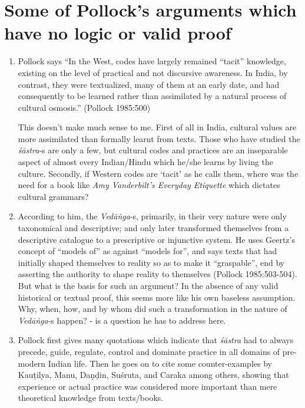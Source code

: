\section*{Some of Pollock's arguments which have no logic or valid proof}

\begin{enumerate}
\item Pollock says ``In the West, codes have largely remained ``tacit'' knowledge, existing on the level of practical and not discursive awareness. In India, by contrast, they were textualized, many of them at an early date, and had consequently to be learned rather than assimilated by a natural process of cultural osmosis.''  (Pollock 1985:500) 

This doesn't make much sense to me. First of all in India, cultural values are more assimilated than formally learnt from texts. Those who have studied the {\it śāstra}-s are only a few, but cultural codes and practices are an inseparable aspect of almost every Indian/Hindu which he/she learns by living the culture.  Secondly, if Western codes are `tacit' as he calls them, where was the need for a book like \textit{Amy Vanderbilt's Everyday Etiquette}  which dictates cultural grammars?

\item According to him, the {\it Vedāṅga}-s,  primarily, in their very nature were only taxonomical and descriptive; and only later transformed themselves from a descriptive catalogue to a prescriptive or injunctive system. He uses Geertz's concept of ``models of'' as against ``models for'', and says texts that had initially shaped themselves to reality so as to make it ``graspable'', end by asserting the authority to shape reality to themselves (Pollock 1985:503-504). But what is the basis for such an argument? In the absence of any valid historical or textual proof, this seems more like his own baseless assumption. Why, when, how, and by whom did such a transformation in the nature of {\it Vedāṅga}-s happen? - is a question he has to address here.

\item Pollock first gives many quotations which indicate that {\it śāstra} had to always precede, guide, regulate, control and dominate practice in all domains of pre-modern Indian life. Then he goes on to cite some counter-examples by Kauṭilya, Manu, Daṇḍin, Suśruta, and Caraka among others, showing that experience or actual practice was considered more important than mere theoretical knowledge from texts/books. 


\end{enumerate}

